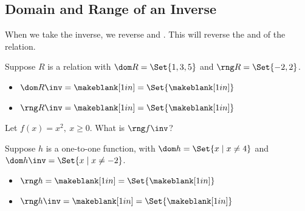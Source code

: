\subsection{Domain and Range of an Inverse} 
When we take the inverse, we reverse \makeblanksmall and \makeblanksmall. This will reverse the \makeblank and \makeblank of the relation.
\begin{Example}
Suppose $R$ is a relation with $\dom R=\Set{1,3,5}$ and $\rng R=\Set{-2,2}$.
\begin{itemize}
\item $\dom R\inv=\makeblank[1in]=\Set{\makeblank[1in]}$
\item $\rng R\inv=\makeblank[1in]=\Set{\makeblank[1in]}$
\end{itemize}
\end{Example}
\begin{Example}
Let $f(x)=x^2,\ x\geq 0$. What is $\rng f\inv$?\makeblanknewf\makeblanknewf
\end{Example}
\begin{Example}
Suppose $h$ is a one-to-one function, with $\dom h=\Set{x\mid x\neq 4}$ and\linebreak$\dom h\inv=\Set{x\mid x\neq -2}$.
\begin{itemize}
\item $\rng h=\makeblank[1in]=\Set{\makeblank[1in]}$
\item $\rng h\inv=\makeblank[1in]=\Set{\makeblank[1in]}$
\end{itemize}
\end{Example}
